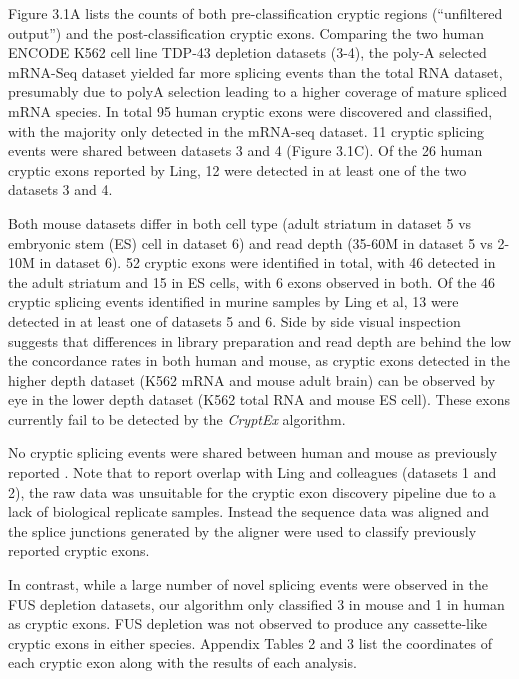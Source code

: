 Figure 3.1A lists the counts of both pre-classification cryptic regions (``unfiltered output'') and the post-classification cryptic exons. Comparing the two human ENCODE K562 cell line TDP-43 depletion datasets (3-4), the poly-A selected mRNA-Seq dataset yielded far more splicing events than the total RNA dataset, presumably due to polyA selection leading to a higher coverage of mature spliced mRNA species. In total 95 human cryptic exons were discovered and classified, with the majority only detected in the mRNA-seq dataset. 11 cryptic splicing events were shared between datasets 3 and 4 (Figure 3.1C). Of the 26 human cryptic exons reported by Ling, 12 were detected in at least one of the two datasets 3 and 4. 

Both mouse datasets differ in both cell type (adult striatum in dataset 5 vs embryonic stem (ES) cell in dataset 6) and read depth (35-60M in dataset 5 vs 2-10M in dataset 6). 52  cryptic exons were identified in total, with 46 detected in the adult striatum and 15 in ES cells, with 6 exons observed in both. Of the 46 cryptic splicing events identified in murine samples by Ling et al, 13 were detected in at least one of datasets 5 and 6. Side by side visual inspection suggests that differences in library preparation and read depth are behind the low the concordance rates in both human and mouse, as cryptic exons detected in the higher depth dataset (K562 mRNA and mouse adult brain) can be observed by eye in the lower depth dataset (K562 total RNA and mouse ES cell). These exons currently fail to be detected by the \emph{CryptEx} algorithm.

No cryptic splicing events were shared between human and mouse as previously reported \citep{Ling2015}. Note that to report overlap with Ling and colleagues (datasets 1 and 2), the raw data was unsuitable for the cryptic exon discovery pipeline due to a lack of biological replicate samples. Instead the sequence data was aligned and the splice junctions generated by the aligner were used to classify previously reported cryptic exons.

In contrast, while a large number of novel splicing events were observed in the FUS depletion datasets, our algorithm only classified 3 in mouse and 1 in human as cryptic exons. FUS depletion was not observed to produce any cassette-like cryptic exons in either species. Appendix Tables 2 and 3 list the coordinates of each cryptic exon along with the results of each analysis.


